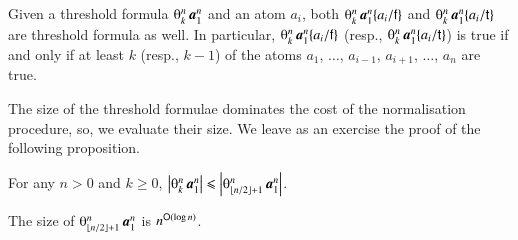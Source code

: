 \begin{remark}
Given a threshold formula $\th kn\avec1n$ and an atom $a_i$, both $\th kn\avec1n\{a_i/\fff\}$ and $\th kn\avec 1n\{a_i/\ttt\}$ are threshold formula as well. In particular, $\th kn\avec1n\{a_i/\fff\}$ (resp., $\th kn\avec 1n\{a_i/\ttt\}$) is true if and only if at least $k$ (resp., $k-1$) of the atoms $a_1$, $\dots$, $a_{i-1}$, $a_{i+1}$, $\dots$, $a_n$ are true.
\end{remark}

The size of the threshold formulae dominates the cost of the normalisation procedure, so, we evaluate their size. We leave as an exercise the proof of the following proposition.

\begin{proposition}\label{PropQuasAux}
For any $n>0$ and $k\ge0$, $\size{\th kn\avec1n}\le\size{\th{\lfloor n/2\rfloor+1}n\avec1n}$.
\end{proposition}

\begin{lemma}\label{LemmaQuas}
The size of\/ $\th{\lfloor n/2\rfloor+1}n\avec1n$ is $n^{{\mathsf O}(\log n)}$.
\end{lemma}

